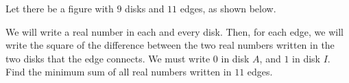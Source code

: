 Let there be a figure with $9$ disks and $11$ edges, as shown below.

We will write a real number in each and every disk. Then, for each edge, we will write the square of the difference between the two real numbers written in the two disks that the edge connects. We must write $0$ in disk $A$, and $1$ in disk $I$. Find the minimum sum of all real numbers written in $11$ edges.